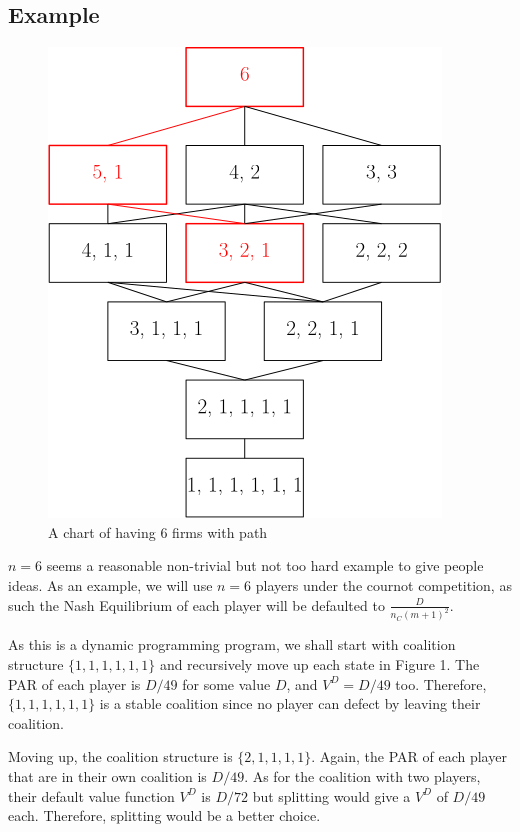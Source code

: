 \documentclass[sigconf,anonymous]{aamas}
\newcommand{\ykc}[1]{{\color{blue} #1}}
\begin{document}
\subsection{Example}

\begin{figure}[h]
	\includegraphics[width=0.8\linewidth]{images/6_firms_with_path.png}
	\caption{A chart of having 6 firms with path }
\end{figure}

\ykc{$n=6$ seems a reasonable non-trivial but not too hard example to give people ideas.}
As an example, we will use $n=6$ players under the cournot competition, as such the Nash Equilibrium of each player will be defaulted to $\frac{D}{n_C(m+1)^2}$. 

As this is a dynamic programming program, we shall start with coalition structure $\{1, 1, 1, 1, 1, 1\}$ and recursively move up each state in Figure 1. The PAR of each player is $D/49$ for some value $D$, and $V^D = D/49$ too. Therefore, $\{1, 1, 1, 1, 1, 1\}$ is a stable coalition since no player can defect by leaving their coalition. 

Moving up, the coalition structure is $\{2, 1, 1, 1, 1\}$. Again, the PAR of each player that are in their own coalition is $D/49$. As for the coalition with two players, their default value function $V^D$ is $D/72$ but splitting would give a $V^D$ of $D/49$ each. Therefore, splitting would be a better choice. 
\end{document}

